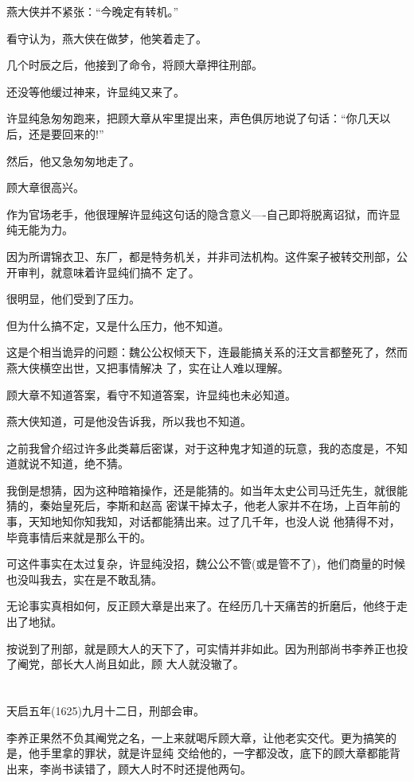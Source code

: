 \documentclass[11pt,a4paper,onecolumn]{article}
\begin{document}
燕大侠并不紧张：``今晚定有转机。''

看守认为，燕大侠在做梦，他笑着走了。

几个时辰之后，他接到了命令，将顾大章押往刑部。

还没等他缓过神来，许显纯又来了。

许显纯急匆匆跑来，把顾大章从牢里提出来，声色俱厉地说了句话：``你几天以后，还是要回来的!''

然后，他又急匆匆地走了。

顾大章很高兴。

作为官场老手，他很理解许显纯这句话的隐含意义----自己即将脱离诏狱，而许显纯无能为力。

因为所谓锦衣卫、东厂，都是特务机关，并非司法机构。这件案子被转交刑部，公开审判，就意味着许显纯们搞不
定了。

很明显，他们受到了压力。

但为什么搞不定，又是什么压力，他不知道。

这是个相当诡异的问题：魏公公权倾天下，连最能搞关系的汪文言都整死了，然而燕大侠横空出世，又把事情解决
了，实在让人难以理解。

顾大章不知道答案，看守不知道答案，许显纯也未必知道。

燕大侠知道，可是他没告诉我，所以我也不知道。

之前我曾介绍过许多此类幕后密谋，对于这种鬼才知道的玩意，我的态度是，不知道就说不知道，绝不猜。

我倒是想猜，因为这种暗箱操作，还是能猜的。如当年太史公司马迁先生，就很能猜的，秦始皇死后，李斯和赵高
密谋干掉太子，他老人家并不在场，上百年前的事，天知地知你知我知，对话都能猜出来。过了几千年，也没人说
他猜得不对，毕竟事情后来就是那么干的。

可这件事实在太过复杂，许显纯没招，魏公公不管(或是管不了)，他们商量的时候也没叫我去，实在是不敢乱猜。

无论事实真相如何，反正顾大章是出来了。在经历几十天痛苦的折磨后，他终于走出了地狱。

按说到了刑部，就是顾大人的天下了，可实情并非如此。因为刑部尚书李养正也投了阉党，部长大人尚且如此，顾
大人就没辙了。

\section[\thesection]{}

天启五年(1625)九月十二日，刑部会审。

李养正果然不负其阉党之名，一上来就喝斥顾大章，让他老实交代。更为搞笑的是，他手里拿的罪状，就是许显纯
交给他的，一字都没改，底下的顾大章都能背出来，李尚书读错了，顾大人时不时还提他两句。
\end{document}

